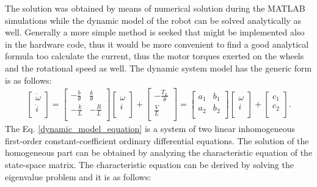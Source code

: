 \documentclass[12pt,english,twoside]{article}
\begin{document}
The solution was obtained by means of numerical solution during the MATLAB simulations while the dynamic model of the robot can be solved analytically as well. Generally a more simple method is seeked that might be implemented also in the hardware code, thus it would be more convenient to find a good analytical formula too calculate the current, thus the motor torques exerted on the wheels and the rotational speed as well. 
The dynamic system model has the generic form is as follows:
\begin{eqnarray}
\left[
\begin{array}{c}
\dot \omega\\[2ex]
\dot i \\
\end{array}
\right]=
\left[
\begin{array}{ccc}
-\frac{b}{\theta } & \frac{k}{\theta } \\[2ex]
-\frac{k}{L} & -\frac{R}{L} \\
\end{array}
\right]
\left[
\begin{array}{c}
\omega  \\[2ex]
i 	\\
\end{array}
\right]
+
\left[
\begin{array}{c}
-\frac{T_{L}}{\theta}  \\[2ex]
\frac{V}{L} 	\\
\end{array}
\right] = 
\left[
\begin{array}{ccc}
a_1 & b_1 \\[2ex]
a_2 & b_2 \\
\end{array}
\right]
\left[
\begin{array}{c}
\omega  \\[2ex]
i 	\\
\end{array}
\right]
+
\left[
\begin{array}{c}
c_1  \\[2ex]
c_2 	\\
\end{array}
\right]
.
\label{dynamic_model_equation}
\end{eqnarray}
The Eq. \ref{dynamic_model_equation} is a system of two linear inhomogeneous first-order constant-coefficient ordinary differential equations. The solution of the homogeneous  part can be obtained by analyzing the characteristic equation of the state-space matrix. The characteristic equation can be derived by solving the eigenvalue problem and it is as follows:
\end{document}
